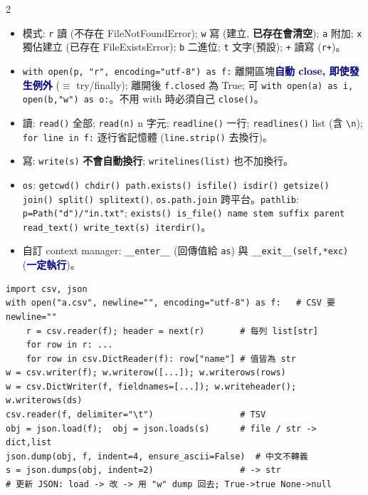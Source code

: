 \documentclass[12pt]{extarticle}
\newcommand{\py}{\lstinline[language={},basicstyle=\ttfamily\fontsize{10.5}{13}\selectfont\bfseries,backgroundcolor=\color{white}]}
\renewcommand{\sec}[1]{\par\vspace{3pt}\noindent{\setlength{\fboxsep}{2pt}\colorbox{navy}{\parbox{\dimexpr\linewidth-4pt}{\color{white}\bfseries\fontsize{13}{16}\selectfont #1}}}\par\vspace{2pt}}
\newcommand{\sub}[1]{\textcolor{navy}{\textbf{#1}}}
\newcommand{\warn}[1]{\textcolor{warn}{\textbf{#1}}}
\newenvironment{bl}{\begin{itemize}[leftmargin=10pt,itemsep=1pt,parsep=0pt,topsep=1pt,partopsep=0pt,labelsep=3pt,label={\textbullet}]}{\end{itemize}}
\begin{document}
\begin{multicols*}{2}
\sec{19. 檔案 I/O (Lec6)}
\begin{bl}
\item 模式: \py|r| 讀 (不存在 FileNotFoundError); \py|w| 寫 (建立, \warn{已存在會清空}); \py|a| 附加; \py|x| 獨佔建立 (已存在 FileExistsError); \py|b| 二進位; \py|t| 文字(預設); \py|+| 讀寫 (\py|r+|)。
\item \py|with open(p, "r", encoding="utf-8") as f:| 離開區塊\sub{自動 close, 即使發生例外} ($\equiv$ try/finally); 離開後 \py|f.closed| 為 True; 可 \py|with open(a) as i, open(b,"w") as o:|。不用 with 時必須自己 \py|close()|。
\item 讀: \py|read()| 全部; \py|read(n)| n 字元; \py|readline()| 一行; \py|readlines()| list (含 \py|\n|); \py|for line in f:| 逐行省記憶體 (\py|line.strip()| 去換行)。
\item 寫: \py|write(s)| \warn{不會自動換行}; \py|writelines(list)| 也不加換行。
\item \py|os|: \py|getcwd() chdir() path.exists() isfile() isdir() getsize() join() split() splitext()|, \py|os.path.join| 跨平台。\py|pathlib|: \py|p=Path("d")/"in.txt"|; \py|exists() is_file() name stem suffix parent read_text() write_text(s) iterdir()|。
\item 自訂 context manager: \py|__enter__| (回傳值給 \py|as|) 與 \py|__exit__(self,*exc)| (\sub{一定執行})。
\end{bl}
\begin{lstlisting}
import csv, json
with open("a.csv", newline="", encoding="utf-8") as f:   # CSV 要 newline=""
    r = csv.reader(f); header = next(r)       # 每列 list[str]
    for row in r: ...
    for row in csv.DictReader(f): row["name"] # 值皆為 str
w = csv.writer(f); w.writerow([...]); w.writerows(rows)
w = csv.DictWriter(f, fieldnames=[...]); w.writeheader(); w.writerows(ds)
csv.reader(f, delimiter="\t")                 # TSV
obj = json.load(f);  obj = json.loads(s)      # file / str -> dict,list
json.dump(obj, f, indent=4, ensure_ascii=False)  # 中文不轉義
s = json.dumps(obj, indent=2)                 # -> str
# 更新 JSON: load -> 改 -> 用 "w" dump 回去; True->true None->null
\end{lstlisting}


\end{multicols*}
\end{document}
